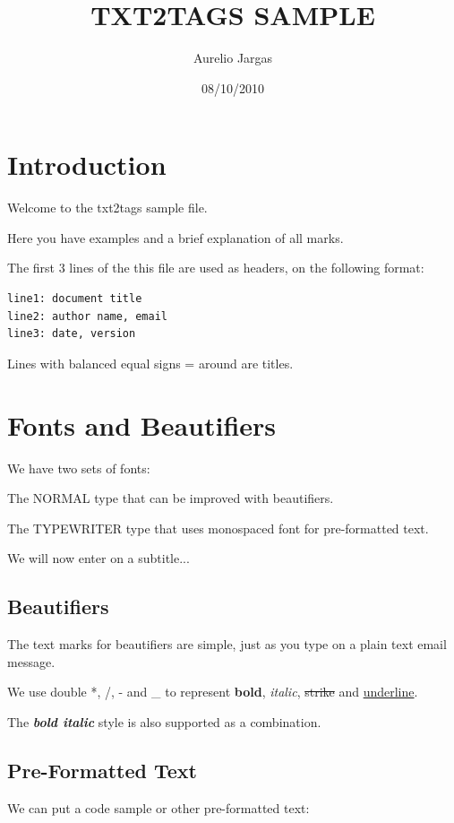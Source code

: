 \documentclass{article}
\title{TXT2TAGS SAMPLE}
\author{Aurelio Jargas}
\begin{document}
\date{08/10/2010}
\maketitle
\clearpage


\section*{Introduction}

Welcome to the txt2tags sample file.

Here you have examples and a brief explanation of all
marks.

The first 3 lines of the this file are used as headers,
on the following format:

\begin{verbatim}
line1: document title
line2: author name, email
line3: date, version
\end{verbatim}

Lines with balanced equal signs = around are titles.

\section*{Fonts and Beautifiers}

We have two sets of fonts:

The NORMAL type that can be improved with beautifiers.

The TYPEWRITER type that uses monospaced font for
pre-formatted text.

We will now enter on a subtitle...

\subsection*{Beautifiers}

The text marks for beautifiers are simple, just as you
type on a plain text email message.

We use double *, /, - and \_ to represent \textbf{bold},
\textit{italic}, \sout{strike} and \underline{underline}.

The \textbf{\textit{bold italic}} style is also supported as a
combination.

\subsection*{Pre-Formatted Text}

We can put a code sample or other pre-formatted text:
\end{document}
